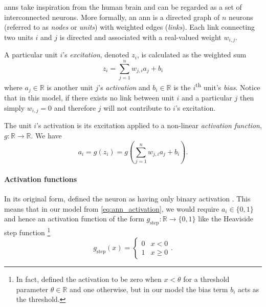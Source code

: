 \documentclass[../main.tex]{subfiles}
\begin{document}
\section{}
\label{sec:ann}
\Glspl{ann} take inspiration from the human brain and can be regarded as a set of interconnected neurons. 
More formally, an \gls{ann} is a directed graph of $n$ neurons (referred to as \emph{nodes} or \emph{units}) with weighted edges (\emph{links}).
Each link connecting two units $i$ and $j$ is directed and associated with a real-valued weight $w_{i,j}$. 

A particular unit $i$'s \emph{excitation}, denoted $z_i$, is calculated as the weighted sum
\begin{equation}
    \label{eq:ann_excitation}
    z_i = \sum_{j=1}^n{w_{j,i} a_j} + b_i
\end{equation}
where $a_j \in \mathbb{R}$ is another unit $j$'s \emph{activation} and $b_i \in \mathbb{R}$ is the $i$\textsuperscript{th} unit's \emph{bias}.
Notice that in this model, if there exists no link between unit $i$ and a particular $j$ then simply $w_{i,j}=0$ and therefore $j$ will not contribute to $i$'s excitation. 

The unit $i$'s activation is its excitation applied to a non-linear \emph{activation function}, $g: \mathbb{R} \rightarrow \mathbb{R}$. We have
\begin{equation}
    \label{eq:ann_activation}
    a_i = g\left(z_i\right) = g\left(\sum_{j=1}^n{w_{j,i} a_j} + b_i\right).
\end{equation}

\paragraph{Activation functions}
In its original form, \citeauthor{mcculloch1943} defined the neuron as having only binary activation \cite*{mcculloch1943}. 
This means that in our model from \cref{eq:ann_activation}, we would require $a_i \in \{0, 1\}$ and hence an activation function of the form $g_\text{step}: \mathbb{R} \rightarrow \{0, 1\}$ like the Heaviside step function%
\footnote{In fact, \citeauthor{mcculloch1943} defined the activation to be zero when $x<\theta$ for a threshold parameter $\theta \in \mathbb{R}$ and one otherwise, but in our model the bias term $b_i$ acts as the threshold.}
\begin{equation*}
    \label{eq:step_activation}
    g_\text{step}(x) = \begin{cases} 
        0 & x < 0 \\
        1 & x \geq 0
    \end{cases}.
\end{equation*}
\end{document}
